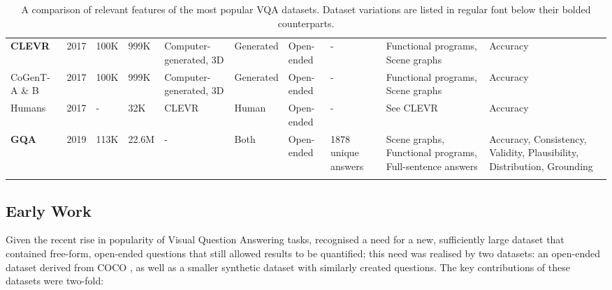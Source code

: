 \begin{landscape}
\begin{center}
\begin{xltabular}{\linewidth}{LLLLLLLLLL}
      \textbf{CLEVR} \cite{johnson2017clevr}
      & 2017
      & 100K  %
      & 999K  %
      & Computer-generated, 3D
      & Generated
      & Open-ended
      & -
      & Functional programs, Scene graphs
      & Accuracy \\
      CoGenT-A \& B
      & 2017
      & 100K
      & 999K
      & Computer-generated, 3D 
      & Generated
      & Open-ended
      & -
      & Functional programs, Scene graphs
      & Accuracy \\
      Humans
      & 2017
      & -
      & 32K  %
      & CLEVR
      & Human
      & Open-ended
      & -
      & See CLEVR
      & Accuracy \\
      \textbf{GQA} \cite{hudson2019gqa}
      & 2019
      & 113K  %
      & 22.6M  %
      & -
      & Both
      & Open-ended
      & 1878 unique answers  %
      & Scene graphs, Functional programs, Full-sentence answers
      & Accuracy, Consistency, Validity, Plausibility, Distribution, Grounding \\
      \bottomrule
      \caption{A comparison of relevant features of the most popular VQA datasets. Dataset variations are listed in regular font below their bolded counterparts.}
      \label{tab:dataset_comparison}
    \end{xltabular}
  \end{center}
\end{landscape}


\subsection{Early Work} 

Given the recent rise in popularity of Visual Question Answering tasks, \citeauthor{antol2015vqa} recognised a need for a new, sufficiently large dataset that contained free-form, open-ended questions that still allowed results to be quantified; this need was realised by two datasets: an open-ended dataset derived from COCO \cite{lin2014microsoft}, as well as a smaller synthetic dataset with similarly created questions.\cite{antol2015vqa} The key contributions of these datasets were two-fold:

